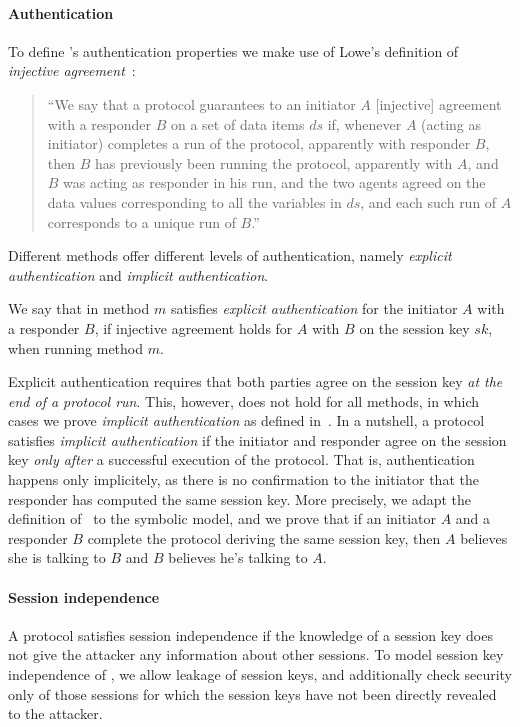 \paragraph{Authentication}
To define \mEdhoc{}'s authentication properties we make use of Lowe's definition
of \emph{injective agreement}~\cite{DBLP:conf/csfw/Lowe97a}:
\begin{quote}
  ``We say that a protocol guarantees to an initiator $A$ [injective] agreement
  with a responder $B$ on a set of data items $ds$ if, whenever $A$ (acting as
  initiator) completes a run of the protocol, apparently with responder $B$,
  then $B$ has previously been running the protocol, apparently with $A$, and
  $B$ was acting as responder in his run, and the two agents agreed on the data
  values corresponding to all the variables in $ds$, and each such run of $A$
  corresponds to a unique run of $B$.''
\end{quote}

Different \mEdhoc{} methods offer different levels of authentication, namely
\emph{explicit authentication} and \emph{implicit authentication}.

We say that \mEdhoc{} in method $m$ satisfies \emph{explicit authentication} for
the initiator $A$ with a responder $B$, if injective agreement holds for $A$
with $B$ on the session key $sk$, when running method $m$.

Explicit authentication requires that both parties agree on the session key
\emph{at the end of a protocol run}.
%
This, however, does not hold for all \mEdhoc{} methods, in which cases we prove
\emph{implicit authentication} as defined
in~\cite{DBLP:journals/iacr/GuilhemFW19}.
%
In a nutshell, a protocol satisfies \emph{implicit authentication} if the
initiator and responder agree on the session key \emph{only after} a successful
execution of the protocol.
%
That is, authentication happens only implicitely, as there is no confirmation to
the initiator that the responder has computed the same session key.
%
More precisely, we adapt the definition of~\cite{DBLP:journals/iacr/GuilhemFW19}
to the symbolic model, and we prove that if an initiator $A$ and a responder $B$
complete the protocol deriving the same session key, then $A$ believes she is
talking to $B$ and $B$ believes he's talking to $A$.

\paragraph{Session independence}
A protocol satisfies session independence if the knowledge of a session key does
not give the attacker any information about other sessions.  To model session
key independence of \mEdhoc, we allow leakage of session keys, and additionally
check security only of those sessions for which the session keys have not been
directly revealed to the attacker.


